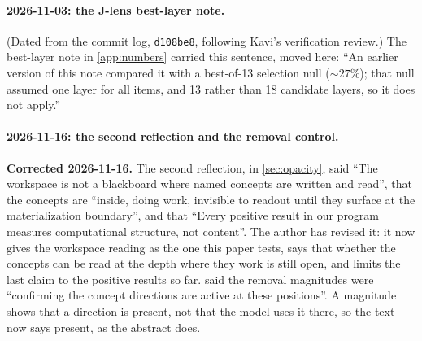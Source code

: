 \documentclass[11pt,a4paper]{article}
\begin{document}
\paragraph{2026-11-03: the J-lens best-layer note.}
(Dated from the commit log, \texttt{d108be8}, following Kavi's
verification review.) The best-layer note in \cref{app:numbers} carried
this sentence, moved here: ``An earlier version of this note compared it
with a best-of-13 selection null (${\sim}27\%$); that null assumed one
layer for all items, and 13 rather than 18 candidate layers, so it does
not apply.''

\paragraph{2026-11-16: the second reflection and the removal control.}
\textbf{Corrected 2026-11-16.} The second reflection, in
\cref{sec:opacity}, said ``The workspace is not a blackboard where named
concepts are written and read'', that the concepts are ``inside, doing
work, invisible to readout until they surface at the materialization
boundary'', and that ``Every positive result in our program measures
computational structure, not content''. The author has revised it: it
now gives the workspace reading as the one this paper tests, says that
whether the concepts can be read at the depth where they work is still
open, and limits the last claim to the positive results so far.
 said the removal magnitudes were ``confirming the
concept directions are active at these positions''. A magnitude shows
that a direction is present, not that the model uses it there, so the
text now says present, as the abstract does.
\end{document}
